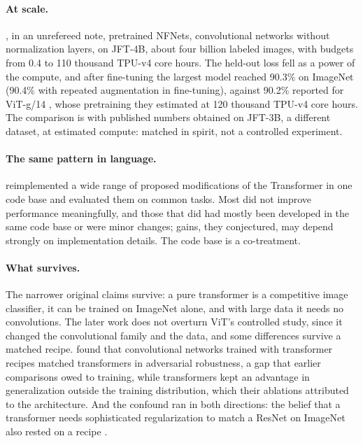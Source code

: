\begin{refsection}
\paragraph{At scale.} \Textcite{SmithEtAl2023}, in an unrefereed note, pretrained NFNets, convolutional networks without normalization layers, on JFT-4B, about four billion labeled images, with budgets from 0.4 to 110 thousand TPU-v4 core hours. The held-out loss fell as a power of the compute, and after fine-tuning the largest model reached 90.3\% on ImageNet (90.4\% with repeated augmentation in fine-tuning), against 90.2\% reported for ViT-g/14 \parencite{ZhaiEtAl2022}, whose pretraining they estimated at 120 thousand TPU-v4 core hours. The comparison is with published numbers obtained on JFT-3B, a different dataset, at estimated compute: matched in spirit, not a controlled experiment.

\paragraph{The same pattern in language.} \Textcite{NarangEtAl2021} reimplemented a wide range of proposed modifications of the Transformer in one code base and evaluated them on common tasks. Most did not improve performance meaningfully, and those that did had mostly been developed in the same code base or were minor changes; gains, they conjectured, may depend strongly on implementation details. The code base is a co-treatment.

\paragraph{What survives.} The narrower original claims survive: a pure transformer is a competitive image classifier, it can be trained on ImageNet alone, and with large data it needs no convolutions. The later work does not overturn ViT's controlled study, since it changed the convolutional family and the data, and some differences survive a matched recipe. \Textcite{BaiEtAl2021} found that convolutional networks trained with transformer recipes matched transformers in adversarial robustness, a gap that earlier comparisons owed to training, while transformers kept an advantage in generalization outside the training distribution, which their ablations attributed to the architecture. And the confound ran in both directions: the belief that a transformer needs sophisticated regularization to match a ResNet on ImageNet also rested on a recipe \parencite{BeyerZhaiKolesnikov2022}.


\end{refsection}
